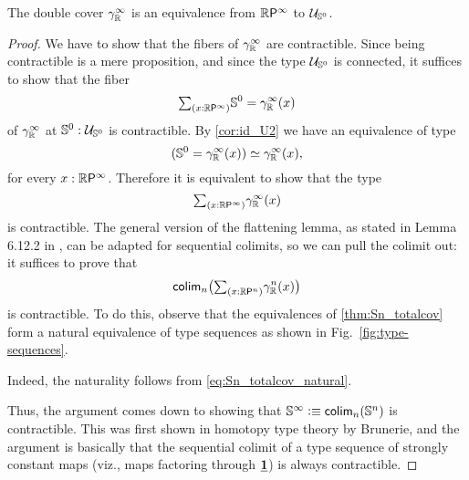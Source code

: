 \begin{thm}\label{thm:RPoo_US0}
The double cover $\tautfam[\R]{\infty}$ is an equivalence from $\rprojective{\infty}$ to $\UU_{\sphere{0}}$. 
\end{thm}

\begin{proof}
We have to show that the fibers of $\tautfam[\R]{\infty}$ are contractible.
Since being contractible is a mere proposition, and since the type $\UU_{\sphere{0}}$
is connected, it suffices to show that the fiber
\begin{equation*}
\sm{x:\rprojective{\infty}}\sphere{0}=\tautfam[\R]{\infty}(x)
\end{equation*}
of $\tautfam[\R]{\infty}$ at $\sphere{0}:\UU_{\sphere{0}}$ is contractible.
By \cref{cor:id_U2} we have an equivalence of type
\begin{equation*}
\eqv{({\sphere{0}}=\tautfam[\R]{\infty}(x))}{\tautfam[\R]{\infty}(x)},
\end{equation*}
for every $x:\rprojective{\infty}$. 
Therefore it is equivalent to show that the type
\begin{equation*}
\sm{x:\rprojective{\infty}}\tautfam[\R]{\infty}(x)
\end{equation*}
is contractible. The general version of the flattening lemma, as stated in
Lemma 6.12.2 in \cite{hottbook}, can be adapted for sequential colimits, so
we can pull the colimit out: it suffices to prove that
\begin{equation*}
\tfcolim_n\bigl(\sm{x:\rprojective{n}}\tautfam[\R]{n}(x)\bigr)
\end{equation*}
is contractible. 
To do this, observe that the equivalences of \cref{thm:Sn_totalcov} form
a natural equivalence of type sequences as shown in Fig.~\ref{fig:type-sequences}.
\begin{figure*}
  \centering
{}
\caption{Natural equivalence of type sequences for Thm~\ref{thm:RPoo_US0}.}
\label{fig:type-sequences}
\end{figure*}
Indeed, the naturality follows from \cref{eq:Sn_totalcov_natural}.

Thus, the argument comes down to showing that $\sphere{\infty}\defeq\tfcolim_n(\sphere{n})$
is contractible. This was first shown in homotopy type theory by Brunerie, and
the argument is basically that the sequential colimit of a type sequence of
strongly constant maps (viz., maps factoring through $\unit$) is always contractible.
\end{proof}

